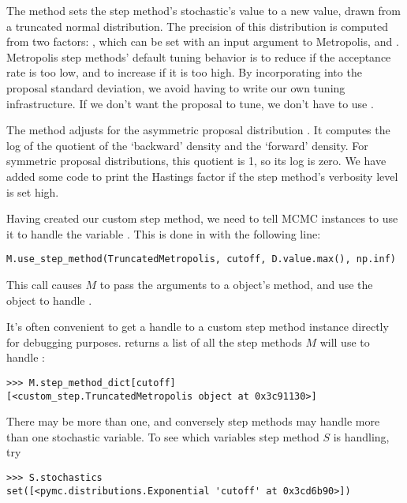 The  method sets the step method's stochastic's value to a new value, drawn from a truncated normal distribution. The precision of this distribution is computed from two factors: , which can be set with an input argument to Metropolis, and . Metropolis step methods' default tuning behavior is to reduce  if the acceptance rate is too low, and to increase  if it is too high. By incorporating  into the proposal standard deviation, we avoid having to write our own tuning infrastructure. If we don't want the proposal to tune, we don't have to use .

The  method adjusts for the asymmetric proposal distribution \cite{gelman}. It computes the log of the quotient of the `backward' density and the `forward' density. For symmetric proposal distributions, this quotient is 1, so its log is zero. We have added some code to print the Hastings factor if the step method's verbosity level is set high.

\medskip
Having created our custom step method, we need to tell MCMC instances to use it to handle the variable . This is done in  with the following line:
\begin{verbatim}
M.use_step_method(TruncatedMetropolis, cutoff, D.value.max(), np.inf)
\end{verbatim}
This call causes $M$ to pass the arguments  to a  object's  method, and use the object to handle . 

\medskip
It's often convenient to get a handle to a custom step method instance directly for debugging purposes.  returns a list of all the step methods $M$ will use to handle :
\begin{verbatim}
>>> M.step_method_dict[cutoff]
[<custom_step.TruncatedMetropolis object at 0x3c91130>]
\end{verbatim}
There may be more than one, and conversely step methods may handle more than one stochastic variable. To see which variables step method $S$ is handling, try
\begin{verbatim}
>>> S.stochastics
set([<pymc.distributions.Exponential 'cutoff' at 0x3cd6b90>])
\end{verbatim}

\hypertarget{user-gen}{}
